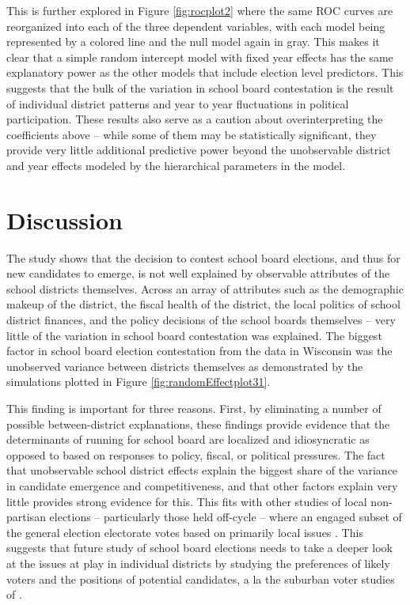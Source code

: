 This is further explored in Figure \ref{fig:rocplot2} where the same ROC curves 
are reorganized into each of the three dependent variables, with each model being 
represented by a colored line and the null model again in gray. This makes it 
clear that a simple random intercept model with fixed year effects has the same 
explanatory power as the other models that include election level predictors. This 
suggests that the bulk of the variation in school board contestation 
is the result of individual district patterns and year to year fluctuations in 
political participation. These results also serve as a caution about overinterpreting the 
coefficients above -- while some of them may be statistically significant, they 
provide very little additional predictive power beyond the unobservable district 
and year effects modeled by the hierarchical parameters in the model. 

\clearpage
\section{Discussion}

The study shows that the decision to contest school board 
elections, and thus for new candidates to emerge, is not well explained by 
observable attributes of the school districts themselves. Across an array of attributes 
such as the demographic makeup of the district, the fiscal health of the district, 
the local politics of school district finances, and the policy decisions of the 
school boards themselves -- very little of the variation in school board 
contestation was explained. The biggest factor in school board election contestation 
from the data in Wisconsin was the unobserved variance between districts themselves 
as demonstrated by the simulations plotted in Figure \ref{fig:randomEffectplot31}. 

This finding is important for three reasons. First, by eliminating a number of 
possible between-district explanations, these findings provide evidence that the 
determinants of running for school board are localized and idiosyncratic as opposed 
to based on responses to policy, fiscal, or political pressures. The fact that 
unobservable school district effects explain the biggest share of the variance in 
candidate emergence and competitiveness, and that other factors explain very little 
provides strong evidence for this. This fits with 
other studies of local non-partisan elections -- particularly those held off-cycle -- 
where an engaged subset of the general election electorate votes based on 
primarily local issues \citep{oliver12}. This suggests that future study of school 
board elections needs to take a deeper look at the issues at play in individual 
districts by studying the preferences of likely voters and the positions of 
potential candidates, a la the suburban voter studies of \citet{oliver12}. 

